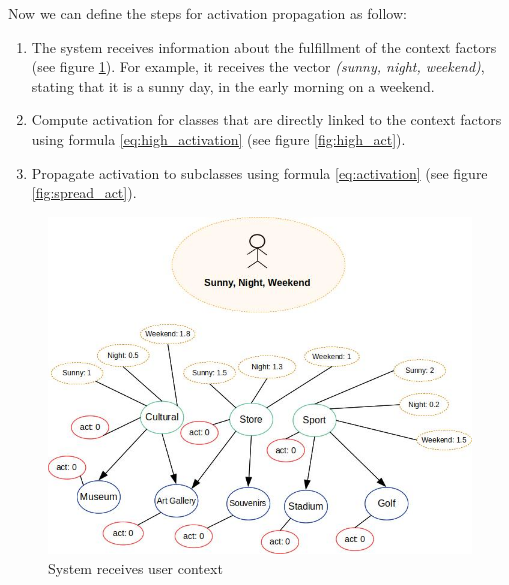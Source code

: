 Now we can define the steps for activation propagation as follow:
\begin{enumerate}
    \item The system receives information about the fulfillment of the context factors (see figure \ref{fig:init_act}). For example, it receives the vector \textit{(sunny, night, weekend)}, stating that it is a sunny day, in the early morning on a weekend.
    
    \item Compute activation for classes that are directly linked to the context factors using formula \ref{eq:high_activation} (see figure \ref{fig:high_act}).
    
    \item Propagate activation to subclasses using formula \ref{eq:activation} (see figure \ref{fig:spread_act}).
\end{enumerate}

\begin{figure}[h]
\centering
\includegraphics[scale=0.45]{draws/initial_act.jpg}
\caption{System receives user context}
\label{fig:init_act}
\end{figure}

